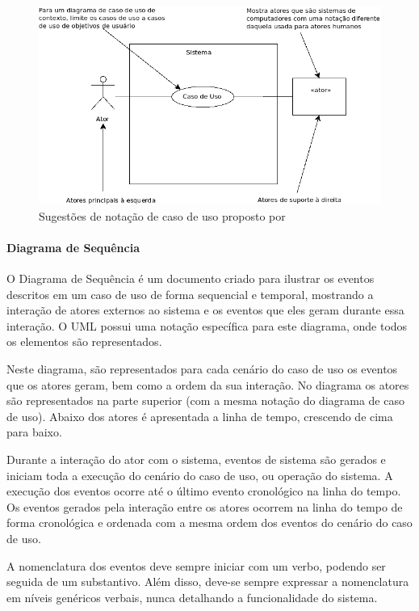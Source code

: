 \begin{figure}
	\centering
	\includegraphics[scale=0.75]{images/exemplo-uml.png}
	\caption{Sugestões de notação de caso de uso proposto por~\cite{larman08}}
	\label{fig:diagrama-uml}
\end{figure}

\paragraph{Diagrama de Sequência}

O Diagrama de Sequência é um documento criado para ilustrar os eventos descritos em um caso de uso de forma sequencial e temporal, mostrando a interação de atores externos ao sistema e os eventos que eles geram durante essa interação. O UML possui uma notação específica para este diagrama, onde todos os elementos são representados.

Neste diagrama, são representados para cada cenário do caso de uso os eventos que os atores geram, bem como a ordem da sua interação. No diagrama os atores são representados na parte superior (com a mesma notação do diagrama de caso de uso). Abaixo dos atores é apresentada a linha de tempo, crescendo de cima para baixo. 

Durante a interação do ator com o sistema, eventos de sistema são gerados e iniciam toda a execução do cenário do caso de uso, ou operação do sistema. A execução dos eventos ocorre até o último evento cronológico na linha do tempo. Os eventos gerados pela interação entre os atores ocorrem na linha do tempo de forma cronológica e ordenada com a mesma ordem dos eventos do cenário do caso de uso.

A nomenclatura dos eventos deve sempre iniciar com um verbo, podendo ser seguida de um substantivo. Além disso, deve-se sempre expressar a nomenclatura em níveis genéricos verbais, nunca detalhando a funcionalidade do sistema.

